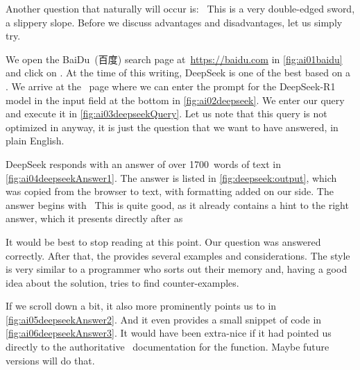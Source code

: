 %
Another question that naturally will occur is:~
This is a very double-edged sword, a slippery slope.
Before we discuss advantages and disadvantages, let us simply try.

We open the BaiDu~(百度) search page at~\url{https://baidu.com} in \cref{fig:ai01baidu} and click on .
At the time of this writing, DeepSeek is one of the best  based on a .
We arrive at the ~page where we can enter the prompt for the DeepSeek\nobreakdashes-R1 model in the input field at the bottom in \cref{fig:ai02deepseek}.
We enter our query~ and execute it in \cref{fig:ai03deepseekQuery}.
Let us note that this query is not optimized in anyway, it is just the question that we want to have answered, in plain English.

DeepSeek responds with an answer of over 1700~words of text in \cref{fig:ai04deepseekAnswer1}.
The answer is listed in \cref{fig:deepseek:output}, which was copied from the browser to text, with formatting added on our side.
The answer begins with~\emph{}
This is quite good, as it already contains a hint to the right answer, which it presents directly after as~\emph{}

It would be best to stop reading at this point.
Our question was answered correctly.
After that, the  provides several examples and considerations.
The style is very similar to a programmer who sorts out their memory and, having a good idea about the solution, tries to find counter-examples.

If we scroll down a bit, it also more prominently points us to  in \cref{fig:ai05deepseekAnswer2}.
And it even provides a small snippet of code in \cref{fig:ai06deepseekAnswer3}.
It would have been extra-nice if it had pointed us directly to the authoritative \python\ documentation for the function.
Maybe future versions will do that.

